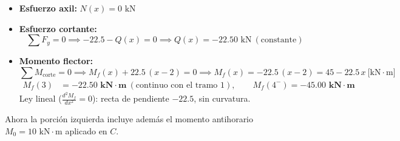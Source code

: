 \begin{itemize}
    \item \textbf{Esfuerzo axil:} $\boxed{N(x) = 0\text{ kN}}$
    \item \textbf{Esfuerzo cortante:}
          \begin{equation}
              \sum F_y = 0 \implies -22.5 - Q(x) = 0 \implies \boxed{Q(x) = -22.50\text{ kN}} \ (\text{constante})
          \end{equation}
    \item \textbf{Momento flector:}
          \begin{equation}
              \sum M_{\text{corte}} = 0 \implies M_f(x) + 22.5\,(x - 2) = 0 \implies \boxed{M_f(x) = -22.5\,(x-2) = 45 - 22.5\,x \ \text{[kN}\cdot\text{m]}}
          \end{equation}
          \begin{align*}
              M_f(3) & = \mathbf{-22.50\text{ kN}\cdot\text{m}} \ (\text{continuo con el tramo 1}), \qquad M_f(4^-) = \mathbf{-45.00\text{ kN}\cdot\text{m}}
          \end{align*}
          Ley lineal ($\tfrac{d^2M_f}{dx^2} = 0$): recta de pendiente $-22.5$, sin curvatura.
\end{itemize}


Ahora la porción izquierda incluye además el momento antihorario $M_0 = 10\text{ kN}\cdot\text{m}$ aplicado en $C$.

